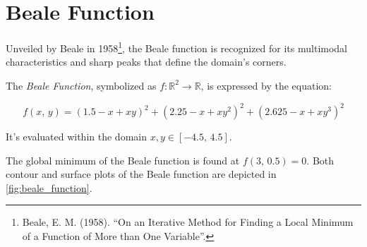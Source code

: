 \section{Beale Function}
\label{sec:beale_function}

Unveiled by Beale in 1958\footnote{
  Beale, E. M. (1958). \enquote{On an Iterative Method for Finding a Local 
  Minimum of a Function of More than One Variable}. 
}, the Beale function is recognized for its multimodal characteristics and 
sharp peaks that define the domain's corners.

\begin{definition}
  \label{def:beale_function}
  The \emph{Beale Function}, symbolized as \(f: \mathbb{R}^2 \rightarrow 
  \mathbb{R}\), is expressed by the equation:

  \begin{equation}
  \label{eq:beale_function}
    f(x,\,y) = (1.5 - x + xy)^2 + (2.25 - x + xy^2)^2 + (2.625 - x + xy^3)^2
  \end{equation}

  It's evaluated within the domain \(x, y \in [-4.5,\,4.5]\).
\end{definition}

The global minimum of the Beale function is found at \(f(3,\,0.5) = 0\).
Both contour and surface plots of the Beale function are depicted in 
\vref{fig:beale_function}.

